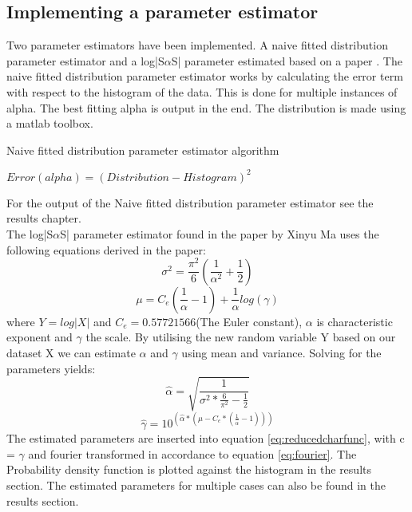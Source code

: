 \subsection{Implementing a parameter estimator}
Two parameter estimators have been implemented. A naive fitted distribution parameter estimator and a log|S$\alpha$S| parameter estimated based on a paper
\cite{XinyuMa1995}. The naive fitted distribution parameter estimator works by calculating the error term with respect to the histogram of the data. This is done for multiple instances of alpha. The best fitting alpha is output in the end. The distribution is made using a matlab toolbox\cite{stbltoolbox}.
\begin{algorithm}[H]
\caption{Naive fitted distribution parameter estimator algorithm}
\begin{algorithmic}
\State $ Error(alpha) = (Distribution - Histogram)^2$
\EndFor
{}
\end{algorithmic}
\end{algorithm}
For the output of the Naive fitted distribution parameter estimator see the results chapter.\\

The log|S$\alpha$S| parameter estimator found in the paper by Xinyu Ma\cite{XinyuMa1995} uses the following equations derived in the paper:
\begin{equation}
\sigma^2 = \frac{\pi^2}{6}(\frac{1}{\alpha^2} + \frac{1}{2})
\end{equation}
\begin{equation}
\mu = C_e ( \frac{1}{\alpha} - 1) + \frac{1}{\alpha} log(\gamma)
\end{equation}
where $Y = log|X|$ and $C_e=0.57721566$(The Euler constant), $\alpha$ is characteristic exponent and $\gamma$ the scale. By utilising the new random variable Y based on our dataset X we can estimate $\alpha$ and $\gamma$ using mean and variance. Solving for  the parameters yields:
\begin{equation}
\hat{\alpha} = \sqrt{\frac{1}{\sigma^2 * \frac{6}{\pi^2} -\frac{1}{2}}}
\end{equation}
\begin{equation}
\hat{\gamma} = 10^{(\hat{\alpha} * ( \mu - C_e * ( \frac{1}{\hat{\alpha}} - 1) ) )}
\end{equation}
The estimated parameters are inserted into equation \ref{eq:reducedcharfunc}, with c = $\gamma$ and fourier transformed in accordance to equation \ref{eq:fourier}. The Probability density function is plotted against the histogram in the results section. The estimated parameters for multiple cases can also be found in the results section.